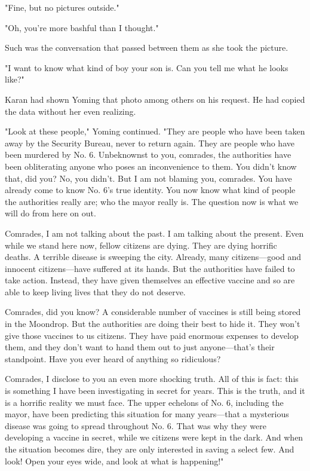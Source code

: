 "Fine, but no pictures outside."

"Oh, you're more bashful than I thought."

Such was the conversation that passed between them as she took the
picture.

"I want to know what kind of boy your son is. Can you tell me what he
looks like?"

Karan had shown Yoming that photo among others on his request. He had
copied the data without her even realizing.

"Look at these people," Yoming continued. "They are people who have been
taken away by the Security Bureau, never to return again. They are
people who have been murdered by No. 6. Unbeknownst to you, comrades,
the authorities have been obliterating anyone who poses an inconvenience
to them. You didn't know that, did you? No, you didn't. But I am not
blaming you, comrades. You have already come to know No. 6's true
identity. You now know what kind of people the authorities really are;
who the mayor really is. The question now is what we will do from here
on out.

Comrades, I am not talking about the past. I am talking about the
present. Even while we stand here now, fellow citizens are dying. They
are dying horrific deaths. A terrible disease is sweeping the city.
Already, many citizens---good and innocent citizens---have suffered at its
hands. But the authorities have failed to take action. Instead, they
have given themselves an effective vaccine and so are able to keep
living lives that they do not deserve.

Comrades, did you know? A considerable number of vaccines is still being
stored in the Moondrop. But the authorities are doing their best to hide
it. They won't give those vaccines to us citizens. They have paid
enormous expenses to develop them, and they don't want to hand them out
to just anyone---that's their standpoint. Have you ever heard of anything
so ridiculous?

Comrades, I disclose to you an even more shocking truth. All of this is
fact: this is something I have been investigating in secret for years.
This is the truth, and it is a horrific reality we must face. The upper
echelons of No. 6, including the mayor, have been predicting this
situation for many years---that a mysterious disease was going to spread
throughout No. 6. That was why they were developing a vaccine in secret,
while we citizens were kept in the dark. And when the situation becomes
dire, they are only interested in saving a select few. And look! Open
your eyes wide, and look at what is happening!"

